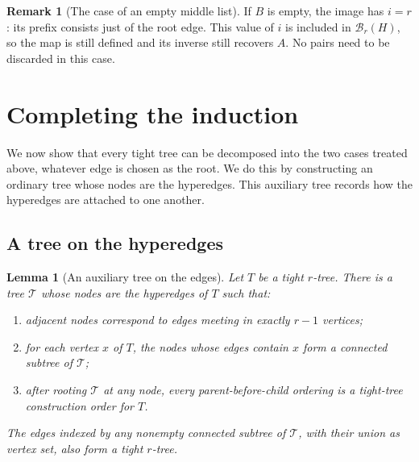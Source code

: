 \documentclass[11pt]{article}
\numberwithin{equation}{section}
\newtheorem{lemma}[theorem]{Lemma}
\theoremstyle{definition}
\newtheorem{remark}[theorem]{Remark}
\begin{document}
\begin{remark}[The case of an empty middle list]
If $B$ is empty, the image has $i=r$: its prefix consists just of the
root edge.  This value of $i$ is included in $\mathcal B_r(H)$, so
the map is still defined and its inverse still recovers $A$.
No pairs need to be discarded in this case.
\end{remark}

\section{Completing the induction}
\label{sec:full-master}

We now show that every tight tree can be decomposed into the two cases
treated above, whatever edge is chosen as the root.  We do this by
constructing an ordinary tree whose nodes are the hyperedges.  This
auxiliary tree records how the hyperedges are attached to one another.

\subsection{A tree on the hyperedges}

\begin{lemma}[An auxiliary tree on the edges]
\label{lem:edge-tree}
Let $T$ be a tight $r$-tree.  There is a tree $\mathscr T$ whose nodes
are the hyperedges of $T$ such that:
\begin{enumerate}[label=\textup{(\roman*)},leftmargin=*]
\item adjacent nodes correspond to edges meeting in exactly $r-1$ vertices;
\item for each vertex $x$ of $T$, the nodes whose edges contain $x$
      form a connected subtree of $\mathscr T$;
\item after rooting $\mathscr T$ at any node, every parent-before-child
      ordering is a tight-tree construction order for $T$.
\end{enumerate}
The edges indexed by any nonempty connected subtree of $\mathscr T$,
with their union as vertex set, also form a tight $r$-tree.
\end{lemma}
\end{document}
